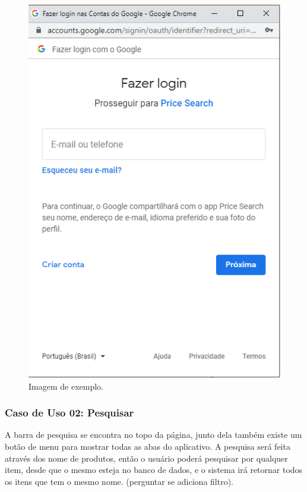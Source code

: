 \begin{figure}[!htb]
\centering
\caption{Imagem de exemplo.}
\includegraphics[width=\linewidth]{figuras/tela-login.png}
\end{figure}

\subsubsection{Caso de Uso 02: Pesquisar}

A barra de pesquisa se encontra no topo da página, junto dela também existe um botão de menu para mostrar todas as abas do aplicativo. A pesquisa será feita através dos nome de produtos, então o usuário poderá pesquisar por qualquer item, desde que o mesmo esteja no banco de dados, e o sistema irá retornar todos os itens que tem o mesmo nome. (perguntar se adiciona filtro).

